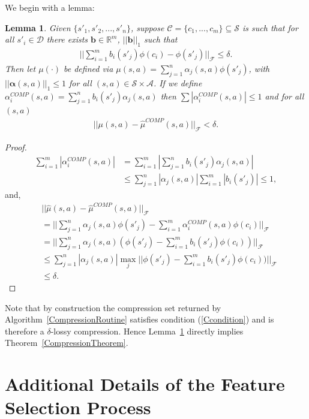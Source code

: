 \documentclass[letterpaper]{article}
\newtheorem{lemma}[theorem]{Lemma}
\newcommand{\cD}{{\mathcal D}}
\newcommand{\cC}{{\mathcal C}}
\newcommand{\cF}{{\mathcal F}}
\newcommand{\cA}{{\mathcal A}}
\newcommand{\cS}{{\mathcal S}}
\newcommand{\balpha}{{\bm \alpha}}
\newcommand{\R}{{\mathbb R}}
\newcommand{\nn}{\nonumber}
\begin{document}
We begin with a lemma:

\begin{lemma}\label{COMPlemma} Given $\{s'_1,s'_2,...,s'_n\}$, suppose $\cC = \{ c_1,...,c_m \}\subseteq \cS$ is such that for all $s'_i\in\cD$ there exists ${\bm b}\in\R^m$, $||\bm b||_1$ such that
\begin{align}
||\sum_{i=1}^m b_i(s'_j) \phi(c_i) - \phi(s'_j)||_{\cF} \le \delta. \label{Ccondition}
\end{align}
Then let $\mu(\cdot)$ be defined via $\mu(s,a) = \sum_{j=1}^n \alpha_j(s,a) \phi(s'_j)$, with $||\balpha(s,a)||_1\le 1$ for all $(s,a)\in\cS\times\cA$. 
If we define $\alpha^{COMP}_i(s,a)=\sum_{j=1}^n b_i(s'_j) \alpha_j(s,a)$ then $\sum |\alpha^{COMP}_i(s,a)|\le 1$ and for all $(s,a)$
\begin{align}
||\mu(s,a) - \hat\mu^{COMP}(s,a)||_\cF < \delta. \nn
\end{align}
\end{lemma}

\begin{proof}
\begin{align}
\sum_{i=1}^m |\alpha^{COMP}_i(s,a)| & = \sum_{i=1}^m |\sum_{j=1}^n b_i(s'_j) \alpha_j(s,a)| \nn\\
&\le \sum_{j=1}^n|\alpha_j(s,a)| \sum_{i=1}^m  |b_i(s'_j)| \le 1, \nn
\end{align}
and,
\begin{align}
&||\hat\mu(s,a) - \hat\mu^{COMP}(s,a)||_\cF \nn\\
&= || \sum_{j=1}^n \alpha_j(s,a) \phi(s'_j) - \sum_{i=1}^m \alpha^{COMP}_i(s,a) \phi(c_i) ||_\cF \nn\\
&= || \sum_{j=1}^n \alpha_j(s,a)( \phi(s'_j) - \sum_{i=1}^m b_i(s'_j)  \phi(c_i)) ||_\cF \nn\\
&\le \sum_{j=1}^n |\alpha_j(s,a)| \max_j || \phi(s'_j) - \sum_{i=1}^m b_i(s'_j)  \phi(c_i)) ||_\cF\nn\\
&\le \delta.\nn
\end{align}
\end{proof}

Note that by construction the compression set returned by Algorithm~\ref{CompressionRoutine} satisfies condition (\ref{Ccondition}) and is therefore a $\delta$-lossy compression. Hence Lemma~\ref{COMPlemma} directly implies Theorem~\ref{CompressionTheorem}.

\section{Additional Details of the Feature Selection Process}\label{MatchingPursuit}
\end{document}
